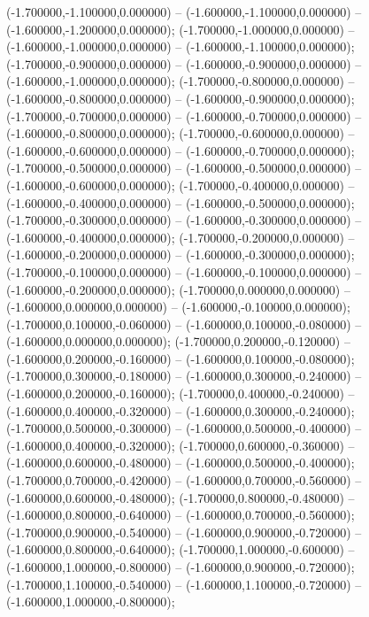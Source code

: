  (-1.700000,-1.100000,0.000000) -- (-1.600000,-1.100000,0.000000) -- (-1.600000,-1.200000,0.000000);
 (-1.700000,-1.000000,0.000000) -- (-1.600000,-1.000000,0.000000) -- (-1.600000,-1.100000,0.000000);
 (-1.700000,-0.900000,0.000000) -- (-1.600000,-0.900000,0.000000) -- (-1.600000,-1.000000,0.000000);
 (-1.700000,-0.800000,0.000000) -- (-1.600000,-0.800000,0.000000) -- (-1.600000,-0.900000,0.000000);
 (-1.700000,-0.700000,0.000000) -- (-1.600000,-0.700000,0.000000) -- (-1.600000,-0.800000,0.000000);
 (-1.700000,-0.600000,0.000000) -- (-1.600000,-0.600000,0.000000) -- (-1.600000,-0.700000,0.000000);
 (-1.700000,-0.500000,0.000000) -- (-1.600000,-0.500000,0.000000) -- (-1.600000,-0.600000,0.000000);
 (-1.700000,-0.400000,0.000000) -- (-1.600000,-0.400000,0.000000) -- (-1.600000,-0.500000,0.000000);
 (-1.700000,-0.300000,0.000000) -- (-1.600000,-0.300000,0.000000) -- (-1.600000,-0.400000,0.000000);
 (-1.700000,-0.200000,0.000000) -- (-1.600000,-0.200000,0.000000) -- (-1.600000,-0.300000,0.000000);
 (-1.700000,-0.100000,0.000000) -- (-1.600000,-0.100000,0.000000) -- (-1.600000,-0.200000,0.000000);
 (-1.700000,0.000000,0.000000) -- (-1.600000,0.000000,0.000000) -- (-1.600000,-0.100000,0.000000);
 (-1.700000,0.100000,-0.060000) -- (-1.600000,0.100000,-0.080000) -- (-1.600000,0.000000,0.000000);
 (-1.700000,0.200000,-0.120000) -- (-1.600000,0.200000,-0.160000) -- (-1.600000,0.100000,-0.080000);
 (-1.700000,0.300000,-0.180000) -- (-1.600000,0.300000,-0.240000) -- (-1.600000,0.200000,-0.160000);
 (-1.700000,0.400000,-0.240000) -- (-1.600000,0.400000,-0.320000) -- (-1.600000,0.300000,-0.240000);
 (-1.700000,0.500000,-0.300000) -- (-1.600000,0.500000,-0.400000) -- (-1.600000,0.400000,-0.320000);
 (-1.700000,0.600000,-0.360000) -- (-1.600000,0.600000,-0.480000) -- (-1.600000,0.500000,-0.400000);
 (-1.700000,0.700000,-0.420000) -- (-1.600000,0.700000,-0.560000) -- (-1.600000,0.600000,-0.480000);
 (-1.700000,0.800000,-0.480000) -- (-1.600000,0.800000,-0.640000) -- (-1.600000,0.700000,-0.560000);
 (-1.700000,0.900000,-0.540000) -- (-1.600000,0.900000,-0.720000) -- (-1.600000,0.800000,-0.640000);
 (-1.700000,1.000000,-0.600000) -- (-1.600000,1.000000,-0.800000) -- (-1.600000,0.900000,-0.720000);
 (-1.700000,1.100000,-0.540000) -- (-1.600000,1.100000,-0.720000) -- (-1.600000,1.000000,-0.800000);
